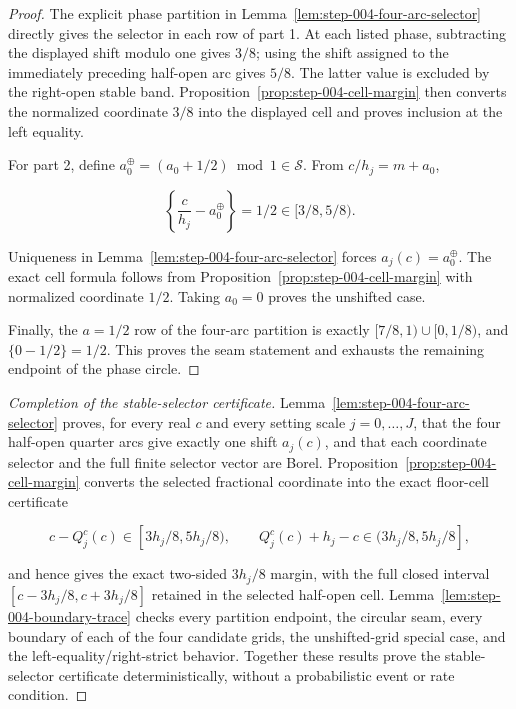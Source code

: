 \begin{proof}
The explicit phase partition in Lemma~\ref{lem:step-004-four-arc-selector} directly gives the selector in each row of part 1. At each listed phase, subtracting the displayed shift modulo one gives \(3/8\); using the shift assigned to the immediately preceding half-open arc gives \(5/8\). The latter value is excluded by the right-open stable band. Proposition~\ref{prop:step-004-cell-margin} then converts the normalized coordinate \(3/8\) into the displayed cell and proves inclusion at the left equality.

For part 2, define \(a_0^{\oplus}=(a_0+1/2)\bmod1\in\mathcal S\). From \(c/h_j=m+a_0\),

\[
\left\{\frac{c}{h_j}-a_0^{\oplus}\right\}=1/2\in[3/8,5/8).
\]

Uniqueness in Lemma~\ref{lem:step-004-four-arc-selector} forces \(a_j(c)=a_0^{\oplus}\). The exact cell formula follows from Proposition~\ref{prop:step-004-cell-margin} with normalized coordinate \(1/2\). Taking \(a_0=0\) proves the unshifted case.

Finally, the \(a=1/2\) row of the four-arc partition is exactly \([7/8,1)\cup[0,1/8)\), and \(\{0-1/2\}=1/2\). This proves the seam statement and exhausts the remaining endpoint of the phase circle.
\end{proof}

\begin{proof}[Completion of the stable-selector certificate]
Lemma~\ref{lem:step-004-four-arc-selector} proves, for every real \(c\) and every setting scale \(j=0,\ldots,J\), that the four half-open quarter arcs give exactly one shift \(a_j(c)\), and that each coordinate selector and the full finite selector vector are Borel. Proposition~\ref{prop:step-004-cell-margin} converts the selected fractional coordinate into the exact floor-cell certificate

\[
c-Q_j^c(c)\in[3h_j/8,5h_j/8),
\qquad
Q_j^c(c)+h_j-c\in(3h_j/8,5h_j/8],
\]

and hence gives the exact two-sided \(3h_j/8\) margin, with the full closed interval \([c-3h_j/8,c+3h_j/8]\) retained in the selected half-open cell. Lemma~\ref{lem:step-004-boundary-trace} checks every partition endpoint, the circular seam, every boundary of each of the four candidate grids, the unshifted-grid special case, and the left-equality/right-strict behavior. Together these results prove the stable-selector certificate deterministically, without a probabilistic event or rate condition.
\end{proof}

